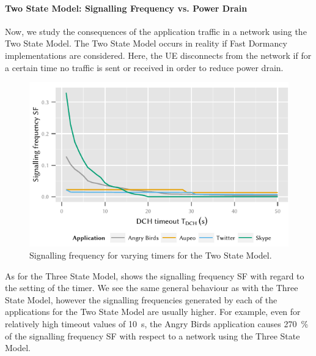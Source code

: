 \paragraph*{Two State Model: Signalling Frequency vs. Power Drain}\label{sec:network:network_traces:numerical_results:two_states}
Now, we study the consequences of the application traffic in a network using the Two State Model.
The Two State Model occurs in reality if Fast Dormancy implementations are considered.
Here, the \gls{UE} disconnects from the network if for a certain time no traffic is sent or received in order to reduce power drain.
\begin{figure}
	\centering
	\includegraphics{network/network_traces/numerical_results/figures/2_state_tdch_vs_frequency}
	\caption{Signalling frequency  for varying \TDCH timers for the Two State Model.}\label{fig:network:network_traces:numerical_results:two_states:signalling}
\end{figure}
As for the Three State Model,  shows the signalling frequency \gls{SF} with regard to the setting of the \TDCH timer.
We see the same general behaviour as with the Three State Model, however the signalling frequencies generated by each of the applications for the Two State Model are usually higher.
For example, even for relatively high \TDCH timeout values of \SI{10}{\second}, the Angry Birds application causes \SI{270}{\percent} of the signalling frequency \gls{SF} with respect to a network using the Three State Model.

